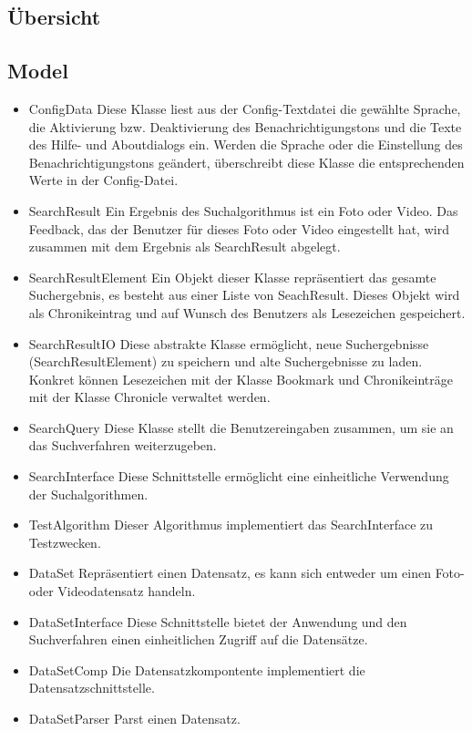 \subsection{Übersicht}

\subsection{Model}
\begin{itemize}

	\item ConfigData \newline
			Diese Klasse liest aus der Config-Textdatei die gewählte Sprache, die Aktivierung bzw. Deaktivierung des 							Benachrichtigungstons und die Texte des Hilfe- und Aboutdialogs ein.
			Werden die Sprache oder die Einstellung des Benachrichtigungstons geändert, überschreibt diese Klasse die 							entsprechenden Werte in der Config-Datei.
	\item SearchResult \newline
			Ein Ergebnis des Suchalgorithmus ist ein Foto oder Video. Das Feedback, das der Benutzer für dieses Foto oder Video 				eingestellt hat, wird zusammen mit dem Ergebnis als SearchResult abgelegt.
	\item SearchResultElement \newline
			Ein Objekt dieser Klasse repräsentiert das gesamte Suchergebnis, es besteht aus einer Liste von SeachResult. Dieses 				Objekt wird als Chronikeintrag und auf Wunsch des Benutzers als Lesezeichen gespeichert.
	\item SearchResultIO \newline
			Diese abstrakte Klasse ermöglicht, neue Suchergebnisse (SearchResultElement) zu speichern und alte Suchergebnisse zu 				laden. Konkret können Lesezeichen mit der Klasse Bookmark und Chronikeinträge mit der Klasse Chronicle verwaltet 					werden.
	\item SearchQuery \newline
			Diese Klasse stellt die Benutzereingaben zusammen, um sie an das Suchverfahren weiterzugeben.
	\item SearchInterface \newline
			Diese Schnittstelle ermöglicht eine einheitliche Verwendung der Suchalgorithmen.
	\item TestAlgorithm \newline
			Dieser Algorithmus implementiert das SearchInterface zu Testzwecken.
	\item DataSet \newline
			Repräsentiert einen Datensatz, es kann sich entweder um einen Foto- oder Videodatensatz handeln.
	\item DataSetInterface \newline
			Diese Schnittstelle bietet der Anwendung und den Suchverfahren einen einheitlichen Zugriff auf die Datensätze.
	\item DataSetComp \newline
			Die Datensatzkompontente implementiert die Datensatzschnittstelle.
	\item DataSetParser \newline
			Parst einen Datensatz.


\end{itemize}
